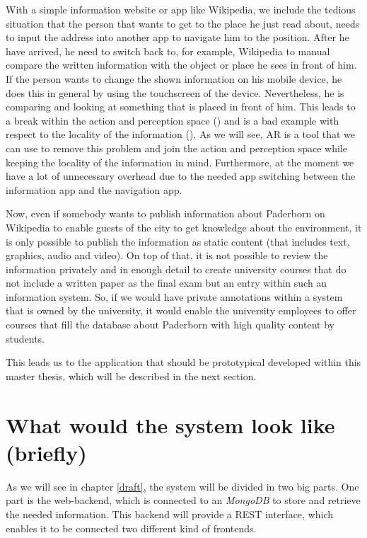 With a simple information website or app like Wikipedia, we include the tedious situation that the person that wants to get to the place he just read about, needs to input the address into another app to navigate him to the position. After he have arrived, he need to switch back to, for example, Wikipedia to manual compare the written information with the object or place he sees in front of him. If the person wants to change the shown information on his mobile device, he does this in general by using the touchscreen of the device. Nevertheless, he is comparing and looking at something that is placed in front of him. This leads to a break within the action and perception space (\cite{ham01}) and is a bad example with respect to the locality of the information (\cite{Bon10}). As we will see, \ac{AR} is a tool that we can use to remove this problem and join the action and perception space while keeping the locality of the information in mind.  Furthermore, at the moment we have a lot of unnecessary overhead due to the needed app switching between the information app and the navigation app.   

Now, even if somebody wants to publish information about Paderborn on Wikipedia to enable guests of the city to get knowledge about the environment, it is only possible to publish the information as static content (that includes text, graphics, audio and video). On top of that, it is not possible to review the information privately and in enough detail to create university courses that do not include a written paper as the final exam but an entry within such an information system.  So, if we would have private annotations within a system that is owned by the university, it would enable the university employees to offer courses that fill the database about Paderborn with high quality content by students.

This leads us to the application that should be prototypical developed within this master thesis, which will be described in the next section. 

\section{What would the system look like (briefly)}
As we will see in chapter \ref{draft}, the system will be divided in two big parts. One part is the web-backend, which is connected to an \textit{MongoDB} to store and retrieve the needed information. This backend will provide a \ac{REST} interface, which enables it to be connected two different kind of frontends. 

